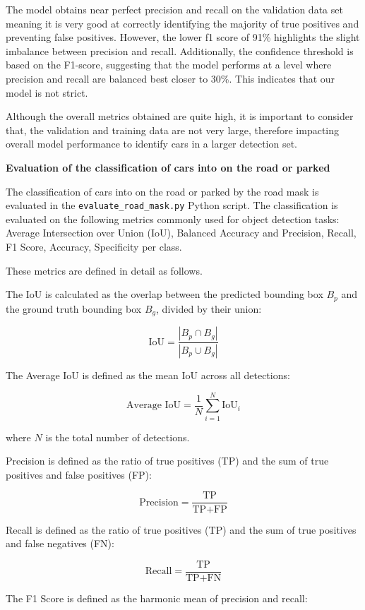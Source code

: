 The model obtains near perfect precision and recall on the validation data set
meaning it is very good at correctly identifying the majority of true positives
and preventing false positives. However, the lower f1 score of 91\% highlights
the slight imbalance between precision and recall. Additionally, the confidence
threshold is based on the F1-score, suggesting that the model performs at a
level where precision and recall are balanced best closer to 30\%. This
indicates that our model is not strict.

Although the overall metrics obtained are quite high, it is important to
consider that, the validation and training data are not very large, therefore
impacting overall model performance to identify cars in a larger detection set.

\textbf{Evaluation of the classification of cars into on the road or parked}

The classification of cars into on the road or parked by the road mask is
evaluated in the \texttt{evaluate\_road\_mask.py} Python script. The
classification is evaluated on the following metrics commonly used for object
detection tasks: Average Intersection over Union (IoU), Balanced Accuracy and
Precision, Recall, F1 Score, Accuracy, Specificity per class.

These metrics are defined in detail as follows.

The IoU is calculated as the overlap between the predicted bounding box \( B_p
\) and the ground truth bounding box \( B_g \), divided by their union:

\[
  \text{IoU} = \frac{|B_p \cap B_g|}{|B_p \cup B_g|}
\]

The Average IoU is defined as the mean IoU across all detections:

\[
  \text{Average IoU} = \frac{1}{N} \sum_{i=1}^{N} \text{IoU}_i
\]

where \( N \) is the total number of detections.

\newpage{}

Precision is defined as the ratio of true positives (TP) and the sum of true
positives and false positives (FP):

\[
  \text{Precision} = \frac{\text{TP}}{\text{TP} + \text{FP}}
\]

Recall is defined as the ratio of true positives (TP) and the sum of true
positives and false negatives (FN):

\[
  \text{Recall} = \frac{\text{TP}}{\text{TP} + \text{FN}}
\]

The F1 Score is defined as the harmonic mean of precision and recall:

